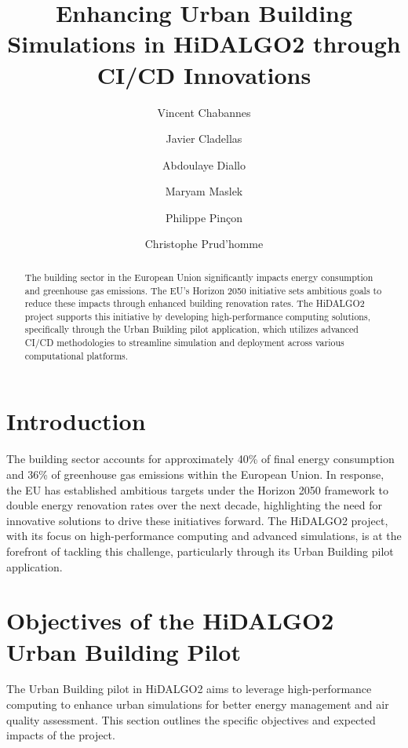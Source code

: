 \documentclass[runningheads]{llncs}
\begin{document}
\title{Enhancing Urban Building Simulations in HiDALGO2 through CI/CD Innovations}
\author{Vincent Chabannes  \and
Javier Cladellas \orcidID{} \and 
Abdoulaye Diallo \orcidID{} \and
Maryam Maslek \orcidID{} \and
Philippe Pinçon \orcidID{} \and
Christophe Prud'homme}


\maketitle

\begin{abstract}
The building sector in the European Union significantly impacts energy consumption and greenhouse gas emissions. The EU's Horizon 2050 initiative sets ambitious goals to reduce these impacts through enhanced building renovation rates. The HiDALGO2 project supports this initiative by developing high-performance computing solutions, specifically through the Urban Building pilot application, which utilizes advanced CI/CD methodologies to streamline simulation and deployment across various computational platforms.

\end{abstract}

\section{Introduction}
The building sector accounts for approximately 40\% of final energy consumption and 36\% of greenhouse gas emissions within the European Union. In response, the EU has established ambitious targets under the Horizon 2050 framework to double energy renovation rates over the next decade, highlighting the need for innovative solutions to drive these initiatives forward. The HiDALGO2 project, with its focus on high-performance computing and advanced simulations, is at the forefront of tackling this challenge, particularly through its Urban Building pilot application.

\section{Objectives of the HiDALGO2 Urban Building Pilot}
The Urban Building pilot in HiDALGO2 aims to leverage high-performance computing to enhance urban simulations for better energy management and air quality assessment. This section outlines the specific objectives and expected impacts of the project.
\end{document}
